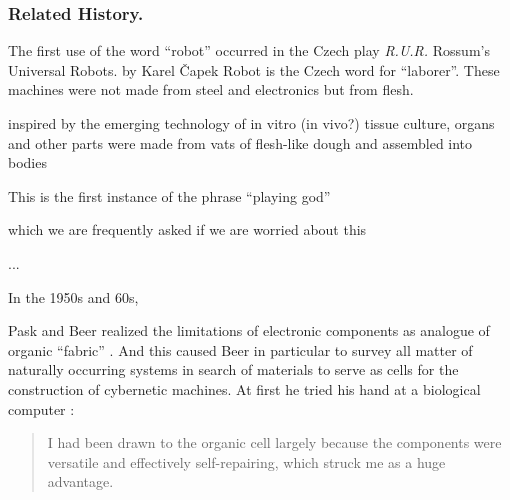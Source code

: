 




\subsubsection*{Related History.}





The first use of the word ``robot'' occurred in the Czech
play \textit{R.U.R.}
Rossum's Universal Robots.
by Karel \v{C}apek
Robot is the Czech word for ``laborer''.
These machines were not made from steel
and electronics
but from flesh.

\cite{ball2020living}

inspired by the emerging technology of 
in vitro (in vivo?) tissue culture,
organs and other parts were made from vats of flesh-like dough and assembled into bodies

This is the first instance of the phrase ``playing god''

which we are frequently asked if we are worried about this

...

In the 1950s and 60s,

Pask and Beer realized the limitations of 
electronic components 
as analogue of organic ``fabric'' \cite{beer1960cybernetics}.
And this caused Beer in particular to survey all matter of naturally occurring systems in search of materials to serve as cells for the construction of cybernetic machines.
At first he tried his hand at a biological computer
\cite{beer1960cybernetics}:
\begin{quote}
\small
I had been drawn to the organic cell largely because the components were versatile and effectively self-repairing, which struck me as a huge advantage.
\end{quote}



